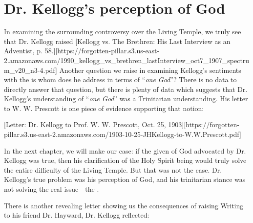 \section*{Dr. Kellogg's perception of God}

In examining the surrounding controversy over the Living Temple, we truly see that Dr. Kellogg raised [Kellogg vs. The Brethren: His Last Interview as an Adventist, p. 58.][https://forgotten-pillar.s3.us-east-2.amazonaws.com/1990\_kellogg\_vs\_brethren\_lastInterview\_oct7\_1907\_spectrum\_v20\_n3-4.pdf] Another question we raise in examining Kellogg's sentiments with the  is whom does he address in terms of “\textit{one God}”? There is no data to directly answer that question, but there is plenty of data which suggests that Dr. Kellogg's understanding of “\textit{one God}” was a Trinitarian understanding. His letter to W. W. Prescott is one piece of evidence supporting that notion:

[Letter: Dr. Kellogg to Prof. W. W. Prescott, Oct. 25, 1903][https://forgotten-pillar.s3.us-east-2.amazonaws.com/1903-10-25-JHKellogg-to-W.W.Prescott.pdf]

In the next chapter, we will make our case: if the given  of God advocated by Dr. Kellogg was true, then his clarification of the Holy Spirit being  would truly solve the entire difficulty of the Living Temple. But that was not the case. Dr. Kellogg's true problem was his perception of God, and his trinitarian stance was not solving the real issue—the .

There is another revealing letter showing us the consequences of raising  Writing to his friend Dr. Hayward, Dr. Kellogg reflected:

